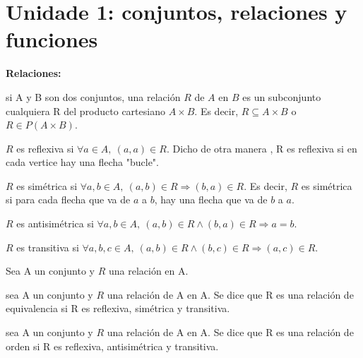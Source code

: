 \section{Unidade 1: conjuntos, relaciones y funciones}


\textbf{Relaciones:}

\begin{teoria}
si A y B son dos conjuntos, una relación $R$ de $A$ en $B$ es un subconjunto cualquiera R del producto cartesiano $A \times B$. Es decir, $R \subseteq A \times B$ o $R \in P (A \times B)$.
\end{teoria}

\begin{teoria}[title=Propiedades de las relaciones]
\begin{listapropiedades}
  \item[Reflexiva] $R$ es reflexiva si $\forall a \in A,\ (a,a)\in R$. Dicho de otra manera , R es reflexiva si en cada vertice hay una flecha "bucle".
  \item[Simétrica] $R$ es simétrica si $\forall a,b \in A,\ (a,b)\in R \Rightarrow (b,a)\in R$. Es decir, $R$ es simétrica si para cada flecha que va de $a$ a $b$, hay una flecha que va de $b$ a $a$.
  \item[Antisimétrica] $R$ es antisimétrica si $\forall a,b \in A,\ (a,b)\in R \wedge (b,a)\in R \Rightarrow a=b$.
  \item[Transitiva] $R$ es transitiva si $\forall a,b,c \in A,\ (a,b)\in R \wedge (b,c)\in R \Rightarrow (a,c)\in R$.
\end{listapropiedades}
\end{teoria}


\begin{teoria}[title=Relación de equivalencia y relación de orden]
  Sea A un conjunto y $R$ una relación en A. 
  \begin{listapropiedades}
    \item[Relación de equivalencia] sea A un conjunto y $R$ una relación de A en A. 
      Se dice que R es una relación de equivalencia si R es reflexiva, simétrica y transitiva.
    \item[Relación de orden] sea A un conjunto y $R$ una relación de A en A. 
      Se dice que R es una relación de orden si R es reflexiva, antisimétrica y transitiva.
  \end{listapropiedades}
\end{teoria}